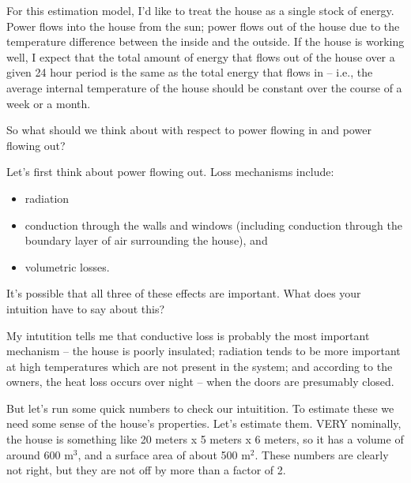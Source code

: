 \documentclass[10pt]{book}
\begin{document}
For this estimation model, I'd like to treat the house as a single stock of energy.  Power flows into the house from the sun; power flows out of the house due to the temperature difference between the inside and the outside.  If the house is working well, I expect that the total amount of energy that flows out of the house over a given 24 hour period is the same as the total energy that flows in -- i.e., the average internal temperature of the house should be constant over the course of a week or a month. 

So what should we think about with respect to power flowing in and power flowing out?

Let's first think about power flowing out.  Loss mechanisms include:

\begin{itemize}
\item radiation
\item conduction through the walls and windows (including conduction through the boundary layer of air surrounding the house), and
\item volumetric losses.  
\end{itemize}

It's possible that all three of these effects are important.  What does your intuition have to say about this?  

My intutition tells me that conductive loss is probably the most important mechanism -- the house is poorly insulated; radiation tends to be more important at high temperatures which are not present in the system; and according to the owners, the heat loss occurs over night -- when the doors are presumably closed.  

But let's run some quick numbers to check our intuitition.  To estimate these we need some sense of the house's properties.  Let's estimate them.  VERY nominally, the house is something like 20 meters x 5 meters x 6 meters, so it has a volume of around 600 m$^3$, and a surface area of about 500 m$^2$.  These numbers are clearly not right, but they are not off by more than a factor of 2.
 
\end{document}
